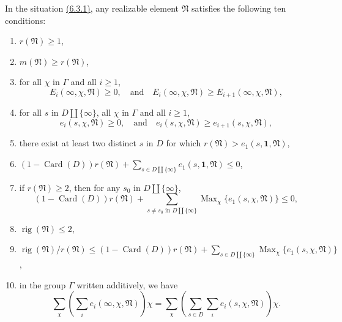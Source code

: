 In the situation \hyperref[par:6.3.1]{(6.3.1)}, any realizable element \(\mathfrak{N}\) satisfies the following ten conditions:
\begin{enumerate}[label=(\arabic*)]
\item \(r(\mathfrak{N})\geq 1\),
\item \(m(\mathfrak{N})\geq r(\mathfrak{N})\),
\item for all \(\chi\) in \(\Gamma\) and all \(i\geq 1\),
\[
E_i(\infty,\chi,\mathfrak{N})\geq 0,\quad\text{and}\quad E_i(\infty,\chi,\mathfrak{N})\geq E_{i+1}(\infty,\chi,\mathfrak{N}),
\]
\item for all \(s\) in \(D\amalg\{\infty\}\), all \(\chi\) in \(\Gamma\) and all \(i\geq 1\),
\[
e_i(s,\chi,\mathfrak{N})\geq 0,\quad\text{and}\quad e_i(s,\chi,\mathfrak{N})\geq e_{i+1}(s,\chi,\mathfrak{N}),
\]
\item there exist at least two distinct \(s\) in \(D\) for which \(r(\mathfrak{N})>e_1(s,\mathbf{1},\mathfrak{N})\),
\item \((1-\operatorname{Card}(D))r(\mathfrak{N})+\sum_{s\in D\amalg\{\infty\}}e_1(s,\mathbf{1},\mathfrak{N})\leq 0\),
\item if \(r(\mathfrak{N})\geq 2\), then for any \(s_0\) in \(D\amalg\{\infty\}\),
\[
(1-\operatorname{Card}(D))r(\mathfrak{N})
+\sum_{s\ne s_0\text{ in }D\amalg\{\infty\}}\operatorname{Max}_{\chi}\{e_1(s,\chi,\mathfrak{N})\}\leq 0,
\]
\item \(\operatorname{rig}(\mathfrak{N})\leq 2\),
\item \(\operatorname{rig}(\mathfrak{N})/r(\mathfrak{N})\leq (1-\operatorname{Card}(D))r(\mathfrak{N})+\sum_{s\in D\amalg\{\infty\}}\operatorname{Max}_{\chi}\{e_1(s,\chi,\mathfrak{N})\}\),
\item in the group \(\Gamma\) written additively, we have
\[
\sum_\chi\left(\sum_i e_i(\infty,\chi,\mathfrak{N})\right)\chi
=\sum_\chi\left(\sum_{s\in D}\sum_i e_i(s,\chi,\mathfrak{N})\right)\chi.
\]
\end{enumerate}
